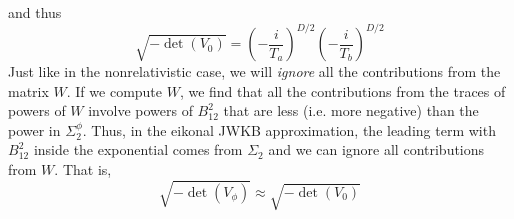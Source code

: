 and thus
\begin{equation}
	\sqrt{- \det{(V_{0})}} = \left(- \frac{i}{T_{a}} \right)^{D/2} \left(- \frac{i}{T_{b}} \right)^{D/2} \label{DetV0}
\end{equation}
Just like in the nonrelativistic case, we will \textit{ignore} all the contributions from the matrix $W$. If we compute $W$, we find that all the contributions from the traces of powers of $W$ involve powers of $B_{12}^{2}$ that are less (i.e. more negative) than the power in $\Sigma_{2}^{\phi}$. Thus, in the eikonal JWKB approximation, the leading term with $B_{12}^{2}$ inside the exponential comes from $\Sigma_{2}$ and we can ignore all contributions from $W$. That is,
\begin{equation}
	\sqrt{- \det{(V_{\phi})}} \approx \sqrt{- \det{(V_{0})}} \label{DetV}
\end{equation}
